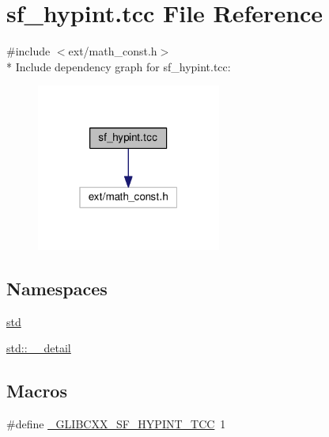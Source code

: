 \hypertarget{sf__hypint_8tcc}{}\section{sf\+\_\+hypint.\+tcc File Reference}
\label{sf__hypint_8tcc}
{\ttfamily \#include $<$ext/math\+\_\+const.\+h$>$}\\*
Include dependency graph for sf\+\_\+hypint.\+tcc\+:
\nopagebreak
\begin{figure}[H]
\begin{center}
\leavevmode
\includegraphics[width=172pt]{sf__hypint_8tcc__incl}
\end{center}
\end{figure}
\subsection*{Namespaces}
\begin{DoxyCompactItemize}
\item 
 \hyperlink{namespacestd}{std}
\item 
 \hyperlink{namespacestd_1_1____detail}{std\+::\+\_\+\+\_\+detail}
\end{DoxyCompactItemize}
\subsection*{Macros}
\begin{DoxyCompactItemize}
\item 
\#define \hyperlink{sf__hypint_8tcc_acf643c2e2a7b3fab7ab4a8be18e29584}{\+\_\+\+G\+L\+I\+B\+C\+X\+X\+\_\+\+S\+F\+\_\+\+H\+Y\+P\+I\+N\+T\+\_\+\+T\+C\+C}~1
\end{DoxyCompactItemize}
